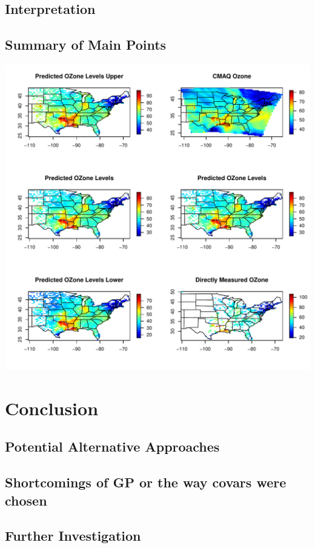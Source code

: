 \documentclass{article}                                                   %
\begin{document}
  \subsection{Interpretation}
  \subsection{Summary of Main Points}
    \includegraphics{raw/all.pdf}
\section{Conclusion}
  \subsection{Potential Alternative Approaches}
  \subsection{Shortcomings of GP or the way covars were chosen}
  \subsection{Further Investigation}
\end{document}
